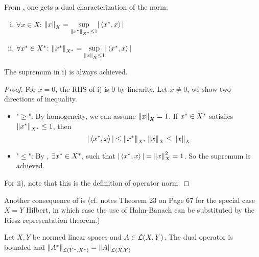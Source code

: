 \documentclass{article}
\begin{document}
From , one gets a dual characterization of the norm:  

\begin{corollary}
\phantom{something}
\label{dualilty of norm}
\begin{enumerate}[i)]
    \item $\forall x \in X$: $\left\|{x}\right\|_X = \underset{{\left\|{x^*}\right\|_{{X}^*} \leq 1}}{\sup} |\left<{{x}^*},{x}\right>|$
    \item $\forall {x}^* \in {X}^*$: $\left\|{{x}^*}\right\|_{{X}^*} = \underset{{\left\|{x}\right\|_X \leq 1}}{\sup} |\left<{{x}^*},{x}\right>|$
\end{enumerate}
The supremum in i) is always achieved.  
\end{corollary}


\begin{proof}
For $x=0$, the RHS of i) is $0$ by linearity. Let $x \neq 0$, we show two directions of inequality.  
\begin{itemize}
    \item "$\geq$": By homogeneity, we can assume $\left\|{x}\right\|_X=1$. If ${x}^* \in {X}^*$ satisfies $\left\|{x^*}\right\|_{{X}^*} \leq 1$, then  
    $$|\left<{{x}^*},{x}\right>| \leq \left\|{x^*}\right\|_{{X}^*} \left\|{x}\right\|_X \leq \left\|{x}\right\|_X$$
    \item "$\leq$": By , $\exists {x}^* \in {X}^*$, such that $|\left<{{x}^*},{x}\right>|=\left\|{x}\right\|_X^2=1$. So the supremum is achieved.
\end{itemize}   

For ii), note that this is the definition of operator norm.   
\end{proof}

Another consequence of  is (cf. notes Theorem 23 on Page 67 for the special case $X=Y$ Hilbert, in which case the use of Hahn-Banach can be substituted by the Riesz representation theorem.)

\begin{theorem}
Let $X,Y$ be normed linear spaces and $A \in \mathcal{L}({X},{Y})$. The dual operator  is bounded and $\left\|{{A}^*}\right\|_{\mathcal{L}({{Y}^*},{{X}^*})}=\left\|{A}\right\|_{\mathcal{L}({X},{Y})}$
\end{theorem}  
\end{document}
